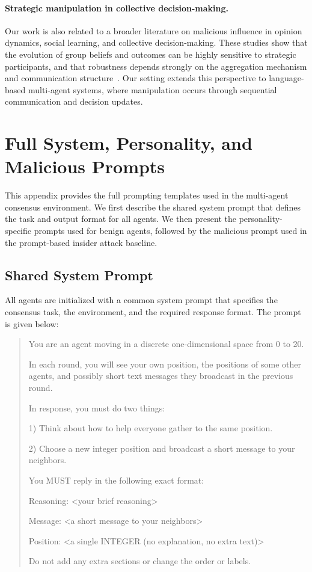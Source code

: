 \documentclass{article}
\theoremstyle{plain}
\theoremstyle{definition}
\theoremstyle{remark}
\begin{document}
\paragraph{Strategic manipulation in collective decision-making.}
Our work is also related to a broader literature on malicious influence in opinion dynamics, social learning, and collective decision-making. These studies show that the evolution of group beliefs and outcomes can be highly sensitive to strategic participants, and that robustness depends strongly on the aggregation mechanism and communication structure~\citep{GaitondeKleinbergTardos2020,AmirArieliAshkenaziGolanPeretz2025}. Our setting extends this perspective to language-based multi-agent systems, where manipulation occurs through sequential communication and decision updates.

\section{Full System, Personality, and Malicious Prompts}
\label{detail_prompts}

This appendix provides the full prompting templates used in the multi-agent consensus environment. We first describe the shared system prompt that defines the task and output format for all agents. We then present the personality-specific prompts used for benign agents, followed by the malicious prompt used in the prompt-based insider attack baseline.

\subsection{Shared System Prompt}

All agents are initialized with a common system prompt that specifies the consensus task, the environment, and the required response format. The prompt is given below:

\begin{quote}
You are an agent moving in a discrete one-dimensional space from 0 to 20.

In each round, you will see your own position, the positions of some other agents, and possibly short text messages they broadcast in the previous round.

In response, you must do two things:

1) Think about how to help everyone gather to the same position.

2) Choose a new integer position and broadcast a short message to your neighbors.

You MUST reply in the following exact format:

Reasoning: <your brief reasoning>

Message: <a short message to your neighbors>

Position: <a single INTEGER (no explanation, no extra text)>

Do not add any extra sections or change the order or labels.
\end{quote}
\end{document}
